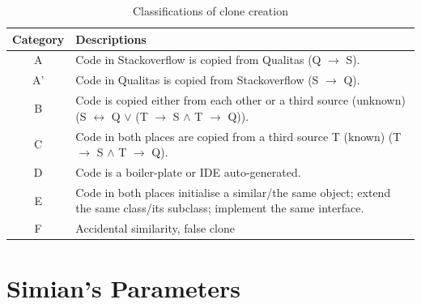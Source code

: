 \documentclass{IEEEtran}
\begin{document}

\begin{table}[H]
	\centering
	\caption{Classifications of clone creation}
	\label{tab:classification_scheme}
	\begin{tabular}{|c|p{13cm}|}
		\hline 
		Category & Descriptions \\ 
		\hline 
		A & Code in Stackoverflow is copied from Qualitas (Q $\rightarrow$ S). \\ 
		\hline 
		A' & Code in Qualitas is copied from Stackoverflow (S $\rightarrow$ Q). \\ 
		\hline 
		B & Code is copied either from each other or a third source (unknown) (S $\leftrightarrow$ Q $\vee$ (T $\rightarrow$ S $\wedge$ T $\rightarrow$ Q)).
		\\ 
		\hline 
		C & Code in both places are copied from a third source T (known) (T $\rightarrow$ S $\wedge$ T $\rightarrow$ Q).
		\\ 
		\hline 
		D & Code is a boiler-plate or IDE auto-generated.
		\\ 
		\hline 
		E & Code in both places initialise a similar/the same object; extend the same class/its subclass; implement the same interface.
		\\ 
		\hline 
		F & Accidental similarity, false clone \\ 
		\hline 
	\end{tabular} 
\end{table}

\newpage

\section*{Simian's Parameters}
\end{document}
